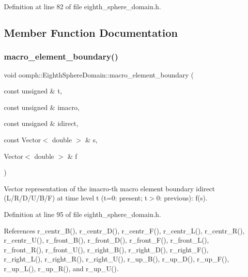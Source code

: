 Definition at line 82 of file eighth\+\_\+sphere\+\_\+domain.\+h.



\subsection{Member Function Documentation}
\mbox{\label{classoomph_1_1EighthSphereDomain_a281727105819669ea9dab9fec120ea63}} 
\subsubsection{\texorpdfstring{macro\+\_\+element\+\_\+boundary()}{macro\_element\_boundary()}}
{\footnotesize\ttfamily void oomph\+::\+Eighth\+Sphere\+Domain\+::macro\+\_\+element\+\_\+boundary (\begin{DoxyParamCaption}\item[{const unsigned \&}]{t,  }\item[{const unsigned \&}]{imacro,  }\item[{const unsigned \&}]{idirect,  }\item[{const Vector$<$ double $>$ \&}]{s,  }\item[{Vector$<$ double $>$ \&}]{f }\end{DoxyParamCaption})\hspace{0.3cm}{\ttfamily [inline]}}



Vector representation of the imacro-\/th macro element boundary idirect (L/\+R/\+D/\+U/\+B/F) at time level t (t=0\+: present; t$>$0\+: previous)\+: f(s). 



Definition at line 95 of file eighth\+\_\+sphere\+\_\+domain.\+h.



References r\+\_\+centr\+\_\+\+B(), r\+\_\+centr\+\_\+\+D(), r\+\_\+centr\+\_\+\+F(), r\+\_\+centr\+\_\+\+L(), r\+\_\+centr\+\_\+\+R(), r\+\_\+centr\+\_\+\+U(), r\+\_\+front\+\_\+\+B(), r\+\_\+front\+\_\+\+D(), r\+\_\+front\+\_\+\+F(), r\+\_\+front\+\_\+\+L(), r\+\_\+front\+\_\+\+R(), r\+\_\+front\+\_\+\+U(), r\+\_\+right\+\_\+\+B(), r\+\_\+right\+\_\+\+D(), r\+\_\+right\+\_\+\+F(), r\+\_\+right\+\_\+\+L(), r\+\_\+right\+\_\+\+R(), r\+\_\+right\+\_\+\+U(), r\+\_\+up\+\_\+\+B(), r\+\_\+up\+\_\+\+D(), r\+\_\+up\+\_\+\+F(), r\+\_\+up\+\_\+\+L(), r\+\_\+up\+\_\+\+R(), and r\+\_\+up\+\_\+\+U().

